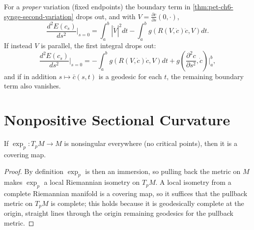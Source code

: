 \begin{remark}
  \label{rem:pet-ch6-second-variation-special-cases}
  \leanok
  For a \emph{proper} variation (fixed endpoints) the boundary term in
  \cref{thm:pet-ch6-synge-second-variation} drops out, and with $V=\frac{\partial
  c}{\partial s}(0,\cdot)$,
  \[
    \frac{d^2E(c_s)}{ds^2}\bigg|_{s=0}=\int_a^b|\dot V|^2dt-\int_a^bg(R(V,\dot c)\dot c,V)dt.
  \]
  If instead $V$ is parallel, the first integral drops out:
  \[
    \frac{d^2E(c_s)}{ds^2}\bigg|_{s=0}=-\int_a^bg(R(V,\dot c)\dot c,V)dt
    +g\!\left(\frac{\partial^2c}{\partial s^2},\dot c\right)\bigg|_a^b,
  \]
  and if in addition $s\mapsto\bar c(s,t)$ is a geodesic for each $t$, the
  remaining boundary term also vanishes.
\end{remark}

\section{Nonpositive Sectional Curvature}

\begin{lemma}[Lemma 6.2.1]
  \label{lem:pet-ch6-nonsingular-exp-covering}
  If $\exp_p:T_pM\to M$ is nonsingular everywhere (no critical points), then it
  is a covering map.
\end{lemma}
\begin{proof}
  By definition $\exp_p$ is then an immersion, so pulling back the metric on
  $M$ makes $\exp_p$ a local Riemannian isometry on $T_pM$. A local isometry
  from a complete Riemannian manifold is a covering map, so it suffices that
  the pullback metric on $T_pM$ is complete; this holds because it is
  geodesically complete at the origin, straight lines through the origin
  remaining geodesics for the pullback metric.
\end{proof}

